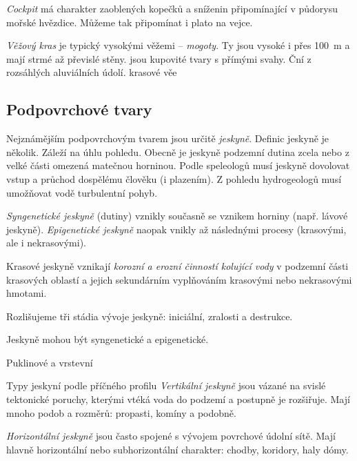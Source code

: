 \emph{Cockpit} má charakter zaoblených kopečků a sníženin připomínající v půdorysu mořské hvězdice. Můžeme tak připomínat i plato na vejce. 

\emph{Věžový kras} je typický vysokými věžemi -- \emph{mogoty}. Ty jsou vysoké i přes \SI{100}{\metre} a mají strmé až převislé stěny. jsou kupovité tvary s přímými svahy. Ční z rozsáhlých aluviálních údolí. krasové věe

%

\subsection{Podpovrchové tvary}

Nejznámějším podpovrchovým tvarem jsou určitě \emph{jeskyně}. Definic jeskyně je několik. Záleží na úhlu pohledu. Obecně je jeskyně podzemní dutina zcela nebo z velké části omezená matečnou horninou. Podle speleologů musí jeskyně dovolovat vstup a průchod dospělému člověku (i plazením). Z pohledu hydrogeologů musí umožňovat vodě turbulentní pohyb.

\emph{Syngenetické jeskyně} (dutiny) vznikly současně se vznikem horniny (např. lávové jeskyně).  \emph{Epigenetické jeskyně} naopak vnikly až následnými procesy (krasovými, ale i nekrasovými). 

Krasové jeskyně vznikají \emph{korozní a erozní činností kolující vody} v podzemní části krasových oblastí a jejich sekundárním vyplňováním krasovými nebo nekrasovými hmotami.

Rozlišujeme tři stádia vývoje jeskyně: iniciální, zralosti a destrukce.

Jeskyně mohou být syngenetické a epigenetické.

Puklinové a vrstevní

Typy jeskyní podle příčného profilu
\emph{Vertikální jeskyně} jsou vázané na svislé tektonické poruchy, kterými vtéká voda do podzemí a postupně je rozšiřuje. Mají mnoho podob a rozměrů: propasti, komíny a podobně.

\emph{Horizontální jeskyně} jsou často spojené s vývojem povrchové údolní sítě. Mají hlavně horizontální nebo subhorizontální charakter: chodby, koridory, haly dómy. 

